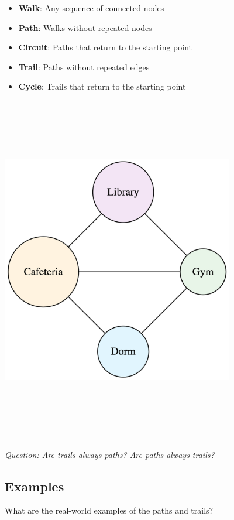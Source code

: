 \documentclass[
  letterpaper,
  DIV=11,
  numbers=noendperiod,
  oneside]{scrartcl}
\begin{document}
\begin{itemize}
\item
  \textbf{Walk}: Any sequence of connected nodes
\item
  \textbf{Path}: Walks without repeated nodes
\item
  \textbf{Circuit}: Paths that return to the starting point
\item
  \textbf{Trail}: Paths without repeated edges
\item
  \textbf{Cycle}: Trails that return to the starting point
\end{itemize}

\includegraphics[width=4in,height=6in]{slide01_files/figure-latex/dot-figure-5.png}

\emph{Question: Are trails always paths? Are paths always trails?}

\subsection{Examples}\label{examples}

\begin{tcolorbox}[enhanced jigsaw, opacityback=0, bottomtitle=1mm, toptitle=1mm, breakable, rightrule=.15mm, colbacktitle=quarto-callout-note-color!10!white, toprule=.15mm, coltitle=black, colback=white, titlerule=0mm, opacitybacktitle=0.6, title=\textcolor{quarto-callout-note-color}{\faInfo}\hspace{0.5em}{Question:}, arc=.35mm, leftrule=.75mm, bottomrule=.15mm, left=2mm, colframe=quarto-callout-note-color-frame]

What are the real-world examples of the paths and trails?

\end{tcolorbox}
\end{document}
